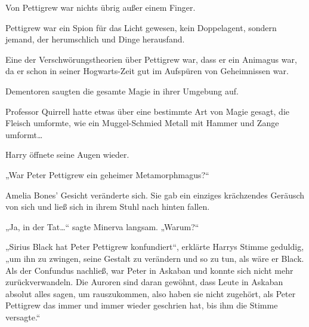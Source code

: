 Von Pettigrew war nichts übrig außer einem Finger.

Pettigrew war ein Spion für das Licht gewesen, kein Doppelagent, sondern jemand, der herumschlich und Dinge herausfand.

Eine der Verschwörungstheorien über Pettigrew war, dass er ein Animagus war, da er schon in seiner Hogwarts-Zeit gut im Aufspüren von Geheimnissen war.

Dementoren saugten die gesamte Magie in ihrer Umgebung auf.

Professor Quirrell hatte etwas über eine bestimmte Art von Magie gesagt, die Fleisch umformte, wie ein Muggel-Schmied Metall mit Hammer und Zange umformt…

Harry öffnete seine Augen wieder.

„War Peter Pettigrew ein geheimer Metamorphmagus?“

Amelia Bones’ Gesicht veränderte sich. Sie gab ein einziges krächzendes Geräusch von sich und ließ sich in ihrem Stuhl nach hinten fallen.

„Ja, in der Tat…“ sagte Minerva langsam. „Warum?“

„Sirius Black hat Peter Pettigrew konfundiert“, erklärte Harrys Stimme geduldig,
„um ihn zu zwingen, seine Gestalt zu verändern und so zu tun, als wäre er Black. Als der Confundus nachließ, war Peter in Askaban und konnte sich nicht mehr zurückverwandeln. Die Auroren sind daran gewöhnt, dass Leute in Askaban absolut alles sagen, um rauszukommen, also haben sie nicht zugehört, als Peter Pettigrew das immer und immer wieder geschrien hat, bis ihm die Stimme versagte.“

